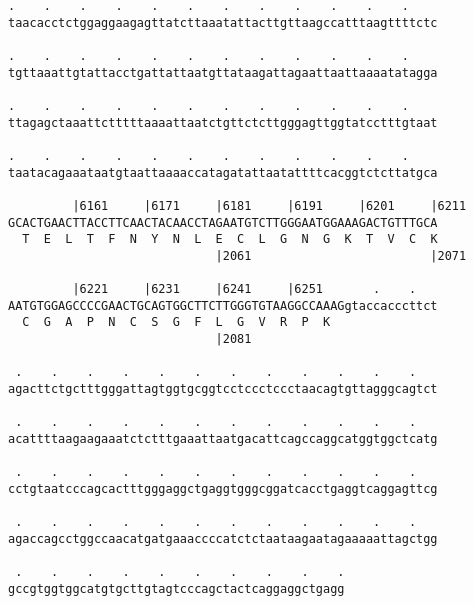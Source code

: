 \documentclass{article}
\begin{document}
\begin{Verbatim}
.    .    .    .    .    .    .    .    .    .    .    .    
taacacctctggaggaagagttatcttaaatattacttgttaagccatttaagttttctc
                                                            
.    .    .    .    .    .    .    .    .    .    .    .    
tgttaaattgtattacctgattattaatgttataagattagaattaattaaaatatagga
                                                            
.    .    .    .    .    .    .    .    .    .    .    .    
ttagagctaaattctttttaaaattaatctgttctcttgggagttggtatcctttgtaat
                                                            
.    .    .    .    .    .    .    .    .    .    .    .    
taatacagaaataatgtaattaaaaccatagatattaatattttcacggtctcttatgca
                                                            
         |6161     |6171     |6181     |6191     |6201     |6211
GCACTGAACTTACCTTCAACTACAACCTAGAATGTCTTGGGAATGGAAAGACTGTTTGCA
  T  E  L  T  F  N  Y  N  L  E  C  L  G  N  G  K  T  V  C  K
                             |2061                         |2071
  
         |6221     |6231     |6241     |6251       .    .   
AATGTGGAGCCCCGAACTGCAGTGGCTTCTTGGGTGTAAGGCCAAAGgtaccacccttct
  C  G  A  P  N  C  S  G  F  L  G  V  R  P  K               
                             |2081                          
  
 .    .    .    .    .    .    .    .    .    .    .    .   
agacttctgctttgggattagtggtgcggtcctccctccctaacagtgttagggcagtct
                                                            
 .    .    .    .    .    .    .    .    .    .    .    .   
acattttaagaagaaatctctttgaaattaatgacattcagccaggcatggtggctcatg
                                                            
 .    .    .    .    .    .    .    .    .    .    .    .   
cctgtaatcccagcactttgggaggctgaggtgggcggatcacctgaggtcaggagttcg
                                                            
 .    .    .    .    .    .    .    .    .    .    .    .   
agaccagcctggccaacatgatgaaaccccatctctaataagaatagaaaaattagctgg
                                                            
 .    .    .    .    .    .    .    .    .    .
gccgtggtggcatgtgcttgtagtcccagctactcaggaggctgagg
                                               
                                               
 

\end{Verbatim}
\end{document}
